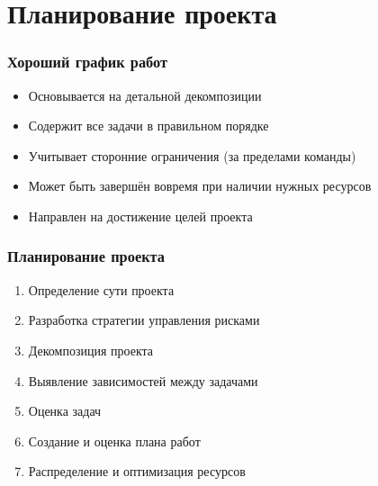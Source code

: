 \documentclass{../../slides-style}
\begin{document}
    \begin{frame}[plain]
        \titlepage
    \end{frame}

    \section{Планирование проекта}

    \begin{frame}
        \frametitle{Хороший график работ}
        \begin{itemize}
            \item Основывается на детальной декомпозиции
            \item Содержит все задачи в правильном порядке
            \item Учитывает сторонние ограничения (за пределами команды)
            \item Может быть завершён вовремя при наличии нужных ресурсов
            \item Направлен на достижение целей проекта
        \end{itemize}
    \end{frame}

    \begin{frame}
        \frametitle{Планирование проекта}
        \begin{enumerate}
            \item Определение сути проекта
            \item Разработка стратегии управления рисками
            \item Декомпозиция проекта
            \item Выявление зависимостей между задачами
            \item Оценка задач
            \item Создание и оценка плана работ
            \item Распределение и оптимизация ресурсов
        \end{enumerate}
    \end{frame}
\end{document}
